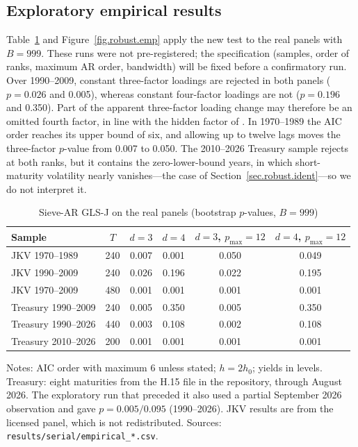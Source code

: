 \documentclass[11pt]{article}
\begin{document}
\subsection{Exploratory empirical results}\label{sec.robust.emp}

Table~\ref{tab.robust.emp} and Figure~\ref{fig.robust.emp} apply the new test to the real panels with $B=999$. These runs were not pre-registered; the specification (samples, order of ranks, maximum AR order, bandwidth) will be fixed before a confirmatory run. Over 1990--2009, constant three-factor loadings are rejected in both panels ($p=0.026$ and 0.005), whereas constant four-factor loadings are not ($p=0.196$ and 0.350). Part of the apparent three-factor loading change may therefore be an omitted fourth factor, in line with the hidden factor of \citet{Duffee2011}. In 1970--1989 the AIC order reaches its upper bound of six, and allowing up to twelve lags moves the three-factor $p$-value from 0.007 to 0.050. The 2010--2026 Treasury sample rejects at both ranks, but it contains the zero-lower-bound years, in which short-maturity volatility nearly vanishes---the case of Section~\ref{sec.robust.ident}---so we do not interpret it.

\begin{table}[htbp]
\centering
\begin{threeparttable}
\small
\caption{Sieve-AR GLS-J on the real panels (bootstrap $p$-values, $B=999$)}\label{tab.robust.emp}
\begin{tabular}{lccccc}
\toprule
Sample & $T$ & $d=3$ & $d=4$ & $d=3$, $p_{\max}=12$ & $d=4$, $p_{\max}=12$\\
\midrule
JKV 1970--1989 & 240 & 0.007 & 0.001 & 0.050 & 0.049\\
JKV 1990--2009 & 240 & 0.026 & 0.196 & 0.022 & 0.195\\
JKV 1970--2009 & 480 & 0.001 & 0.001 & 0.001 & 0.001\\
Treasury 1990--2009 & 240 & 0.005 & 0.350 & 0.005 & 0.350\\
Treasury 1990--2026 & 440 & 0.003 & 0.108 & 0.002 & 0.108\\
Treasury 2010--2026 & 200 & 0.001 & 0.001 & 0.001 & 0.001\\
\bottomrule
\end{tabular}
\begin{tablenotes}\small
\item Notes: AIC order with maximum 6 unless stated; $h=2h_0$; yields in levels. Treasury: eight maturities from the H.15 file in the repository, through August 2026. The exploratory run that preceded it also used a partial September 2026 observation and gave $p=0.005/0.095$ (1990--2026). JKV results are from the licensed panel, which is not redistributed. Sources: \texttt{results/serial/empirical\_*.csv}.
\end{tablenotes}
\end{threeparttable}
\end{table}
\end{document}
